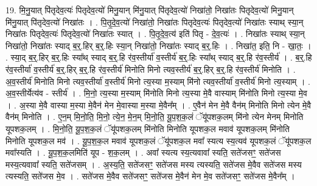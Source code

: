 \documentclass[17pt]{extarticle}
\begin{document}
19. मि॒नु॒यात् पि॑तृदेव॒त्यः॑ पितृदेव॒त्यो॑ मिनु॒यान् मि॑नु॒यात् पि॑तृदेव॒त्यो॑ निखा॑तो॒ निखा॑तः पितृदेव॒त्यो॑ मिनु॒यान् मि॑नु॒यात् पि॑तृदेव॒त्यो॑ निखा॑तः । . पि॒तृ॒दे॒व॒त्यो॑ निखा॑तो॒ निखा॑तः पितृदेव॒त्यः॑ पितृदेव॒त्यो॑ निखा॑तः स्याथ् स्या॒न् निखा॑तः पितृदेव॒त्यः॑ पितृदेव॒त्यो॑ निखा॑तः स्यात् । . पि॒तृ॒दे॒व॒त्य॑ इति॑ पितृ - दे॒व॒त्यः॑ । . निखा॑तः स्याथ् स्या॒न् निखा॑तो॒ निखा॑तः स्याद् ब॒र्॒.हिर् ब॒र्॒.हिः स्या॒न् निखा॑तो॒ निखा॑तः स्याद् ब॒र्॒.हिः । . निखा॑त॒ इति॒ नि - खा॒तः॒ । . स्या॒द् ब॒र्॒.हिर् ब॒र्॒.हिः स्या᳚थ् स्याद् ब॒र्॒.हि र॑व॒स्तीर्या॑ व॒स्तीर्य॑ ब॒र्॒.हिः स्या᳚थ् स्याद् ब॒र्॒.हि र॑व॒स्तीर्य॑ । . ब॒र्॒.हि र॑व॒स्तीर्या॑ व॒स्तीर्य॑ ब॒र्॒.हिर् ब॒र्॒.हि र॑व॒स्तीर्य॑ मिनोति मिनो त्यव॒स्तीर्य॑ ब॒र्॒.हिर् ब॒र्॒.हि र॑व॒स्तीर्य॑ मिनोति । . अ॒व॒स्तीर्य॑ मिनोति मिनो त्यव॒स्तीर्या॑ व॒स्तीर्य॑ मिनो त्य॒स्या म॒स्याम् मि॑नो त्यव॒स्तीर्या॑ व॒स्तीर्य॑ मिनो त्य॒स्याम् । . अ॒व॒स्तीर्येत्य॑व - स्तीर्य॑ । . मि॒नो॒ त्य॒स्या म॒स्याम् मि॑नोति मिनो त्य॒स्या मे॒वै वास्याम् मि॑नोति मिनो त्य॒स्या मे॒व । . अ॒स्या मे॒वै वास्या म॒स्या मे॒वैन॑ मेन मे॒वास्या म॒स्या मे॒वैन᳚म् । . ए॒वैन॑ मेन मे॒वै वैन॑म् मिनोति मिनो त्येन मे॒वै वैन॑म् मिनोति । . ए॒न॒म् मि॒नो॒ति॒ मि॒नो॒ त्ये॒न॒ मे॒न॒म् मि॒नो॒ति॒ यू॒प॒श॒क॒लं ॅयू॑पशक॒लम् मि॑नो त्येन मेनम् मिनोति यूपशक॒लम् । . मि॒नो॒ति॒ यू॒प॒श॒क॒लं ॅयू॑पशक॒लम् मि॑नोति मिनोति यूपशक॒ल मवाव॑ यूपशक॒लम् मि॑नोति मिनोति यूपशक॒ल मव॑ । . यू॒प॒श॒क॒ल मवाव॑ यूपशक॒लं ॅयू॑पशक॒ल मवा᳚ स्यत्य स्य॒त्यव॑ यूपशक॒लं ॅयू॑पशक॒ल मवा᳚स्यति । . यू॒प॒श॒क॒लमिति॑ यूप - श॒क॒लम् । . अवा᳚ स्यत्य स्य॒त्यवावा᳚ स्यति॒ सते॑जसꣳ॒॒ सते॑जस मस्य॒त्यवावा᳚ स्यति॒ सते॑जसम् । . अ॒स्य॒ति॒ सते॑जसꣳ॒॒ सते॑जस मस्य त्यस्यति॒ सते॑जस मे॒वैव सते॑जस मस्य त्यस्यति॒ सते॑जस मे॒व । . सते॑जस मे॒वैव सते॑जसꣳ॒॒ सते॑जस मे॒वैन॑ मेन मे॒व सते॑जसꣳ॒॒ सते॑जस मे॒वैन᳚म् । \newline
\end{document}

